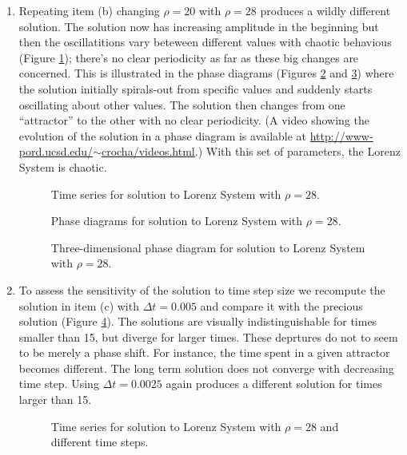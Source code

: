 \documentclass[11pt]{article}
\begin{document}
\begin{enumerate}[label=(\alph*)]
\item Repeating item (b) changing $\rho=20$ with  $\rho=28$ produces a wildly different solution. The solution now has increasing amplitude in the beginning but then the oscillatitions vary beteween different values with chaotic behavious (Figure \ref{lorenz_ts_2}); there's no clear periodicity as far as these big changes are concerned. This is illustrated in the phase diagrams (Figures \ref{lorenz_phase_2} and \ref{lorenz_phase_2_3d}) where the solution initially spirals-out from specific values and suddenly starts oscillating about other values. The solution then changes from one ``attractor'' to the other with no clear periodicity. (A video showing the evolution of the solution in a phase diagram is available at \href{http://www-pord.ucsd.edu/~crocha/videos.html}{http://www-pord.ucsd.edu/$\sim$crocha/videos.html}.) With this set of parameters, the Lorenz System is chaotic.

    \begin{figure}[p]
\centerline{}
\caption{Time series for solution to Lorenz System with $\rho = 28$.}
    \label{lorenz_ts_2}
\end{figure}
 
\begin{figure}[p]
\centerline{}
\caption{Phase diagrams for solution to Lorenz System with $\rho = 28$.}
    \label{lorenz_phase_2}
\end{figure}

 
\begin{figure}[p]
\centerline{}
\caption{Three-dimensional phase diagram for solution to Lorenz System with $\rho = 28$.}
    \label{lorenz_phase_2_3d}
\end{figure}

\item To assess the sensitivity of the solution to time step size we recompute the solution in item  (c) with $\Delta t = 0.005$ and compare it with the precious solution (Figure \ref{comp}). The solutions are visually indistinguishable for times smaller than 15, but diverge for larger times. These deprtures do not to seem to be merely a phase shift. For instance, the time spent in a given attractor becomes different. The long term solution does not converge with decreasing time step. Using $\Delta t = 0.0025$ again produces a different solution for times larger than 15.

\begin{figure}[p]
\centerline{}
\caption{Time series for solution to Lorenz System with $\rho = 28$ and different time steps.}
    \label{comp}
\end{figure}


\end{enumerate}        
\end{document}
